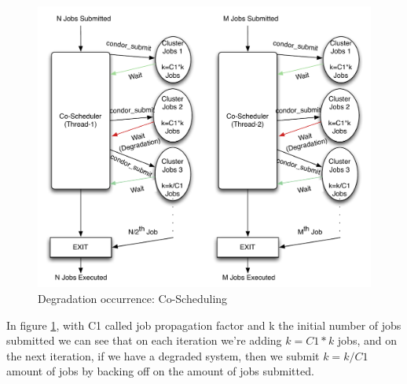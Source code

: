 \documentclass[ms,electronic,double]{nuthesis}
\begin{document}
\begin{figure}[htbp!]
\begin{center}
\includegraphics[scale=0.75]{images/degradation_detection}
\caption{Degradation occurrence: Co-Scheduling}
\label{fig:degradationdetect-intro}
\end{center}
\end{figure}
\FloatBarrier

In figure \ref{fig:degradationdetect-intro}, with C1 called job propagation factor and k the initial number of 
jobs submitted we can see that on each iteration we're adding $k = C1 * k$ jobs, and on the
next iteration, if we have a degraded system, then we submit $k=k/C1$ amount of 
jobs by backing off on the amount of jobs submitted.
\end{document}
